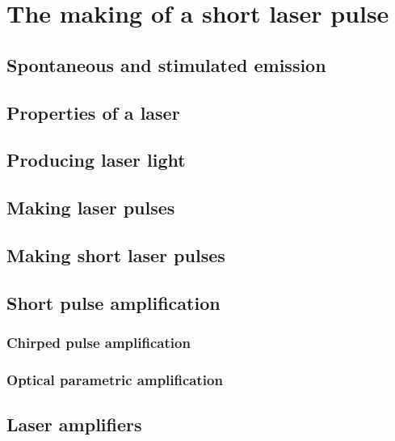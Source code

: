 \chapter{The making of a short laser pulse}\label{ch:MakeShortPulse}

\section{Spontaneous and stimulated emission}
\section{Properties of a laser}
\section{Producing laser light}
\section{Making laser pulses}
\section{Making short laser pulses}
\section{Short pulse amplification}
\subsection{Chirped pulse amplification}
\subsection{Optical parametric amplification}
\section{Laser amplifiers}